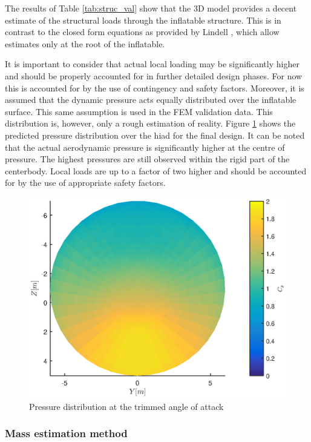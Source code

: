The results of Table \ref{tab:struc_val} show that the 3D model provides a decent estimate of the structural loads through the inflatable structure. This is in contrast to the closed form equations as provided by Lindell \cite{Lindell2006}, which allow estimates only at the root of the inflatable. 

It is important to consider that actual local loading may be significantly higher and should be properly accounted for in further detailed design phases. For now this is accounted for by the use of contingency and safety factors. Moreover, it is assumed that the dynamic pressure acts equally distributed over the inflatable surface. This same assumption is used in the FEM validation data. This distribution is, however, only a rough estimation of reality. Figure \ref{fig:struc_pres} shows the predicted pressure distribution over the \gls{hiad} for the final design. It can be noted that the actual aerodynamic pressure is significantly higher at the centre of pressure. The highest pressures are still observed within the rigid part of the centerbody. Local loads are up to a factor of two higher and should be accounted for by the use of appropriate safety factors.

\begin{figure}[h]
\centering
\includegraphics[width=1\textwidth]{./Figure/Structure/FrontviewCpDist}
\caption{Pressure distribution at the trimmed angle of attack} 
\label{fig:struc_pres}
\end{figure}

\subsubsection{Mass estimation method}

